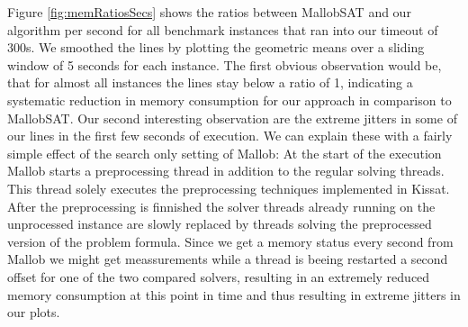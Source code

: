 \documentclass[12pt,a4paper,twoside]{scrartcl}
\numberwithin{equation}{section}
\begin{document}
Figure \ref{fig:memRatiosSecs} shows the ratios between MallobSAT and our algorithm per second for all benchmark instances that ran into our timeout of 300s. We smoothed the lines by plotting the geometric means over a sliding window of 5 seconds for each instance. 
The first obvious observation would be, that for almost all instances the lines stay below a ratio of 1, indicating a systematic reduction in memory consumption for our approach in comparison to MallobSAT.
Our second interesting observation are the extreme jitters in some of our lines in the first few seconds of execution. We can explain these with a fairly simple effect of the search only setting of Mallob: At the start of the execution Mallob starts a preprocessing thread in addition to the regular solving threads. This thread solely executes the preprocessing techniques implemented in Kissat. After the preprocessing is finnished the solver threads already running on the unprocessed instance are slowly replaced by threads solving the preprocessed version of the problem formula. Since we get a memory status every second from Mallob we might get meassurements while a thread is beeing restarted a second offset for one of the two compared solvers, resulting in an extremely reduced memory consumption at this point in time and thus resulting in extreme jitters in our plots.
\end{document}
